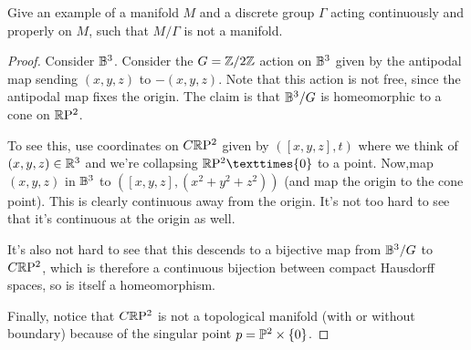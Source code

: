 \begin{exercise}
Give an example of a manifold $M$ and a discrete group $\Gamma$ acting continuously and properly on $M$, such that $M/\Gamma$ is not a manifold.
\end{exercise}
\begin{proof}
Consider $\B^3$. Consider the $G=\Z/2\Z$ action on $\B^3$ given by the antipodal map sending $(x,y,z)$ to $-(x,y,z)$. Note that this action is not free, since the antipodal map fixes the origin. The claim is that $\B^3/G$ is homeomorphic to a cone on $\RP^2$.\par 
To see this, use coordinates on $C\RP^2$ given by $([x,y,z],t)$ where we think of $(x,y,z)\in\R^3$ and we're collapsing $\RP^2×\{0\}$ to a point. Now,map $(x,y,z)$ in $\B^3$ to $([x,y,z],(x^2+y^2+z^2))$ (and map the origin to the cone point). This is clearly continuous away from the origin. It's not too hard to see that it's continuous at the origin as well.\par
It's also not hard to see that this descends to a bijective map from $\B^3/G$ to $C\RP^2$, which is therefore a continuous bijection between compact Hausdorff spaces, so is itself a homeomorphism.\par
Finally, notice that $C\RP^2$ is not a topological manifold (with or without boundary) because of the singular point $p=\P^2\times\{0\}$.
\end{proof}